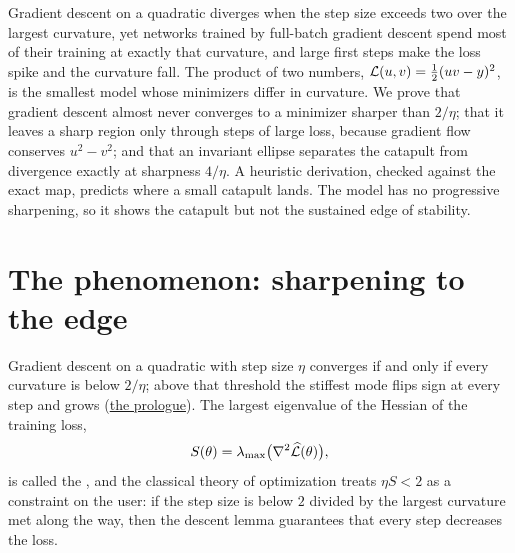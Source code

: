 \newcommand{\stabce}{c_{\mathrm{e}}}

\begin{refsection}

\begin{chaptersummary}
Gradient descent on a quadratic diverges when the step size exceeds two over the largest curvature, yet networks trained by full-batch gradient descent spend most of their training at exactly that curvature, and large first steps make the loss spike and the curvature fall. The product of two numbers, $\mathcal{L}(u,v)=\frac12(uv-y)^2$, is the smallest model whose minimizers differ in curvature. We prove that gradient descent almost never converges to a minimizer sharper than $2/\eta$; that it leaves a sharp region only through steps of large loss, because gradient flow conserves $u^2-v^2$; and that an invariant ellipse separates the catapult from divergence exactly at sharpness $4/\eta$. A heuristic derivation, checked against the exact map, predicts where a small catapult lands. The model has no progressive sharpening, so it shows the catapult but not the sustained edge of stability.
\end{chaptersummary}

\section{The phenomenon: sharpening to the edge}\label{sec:stability:phenomenon}

Gradient descent on a quadratic with step size $\eta$ converges if and only if every curvature is below $2/\eta$; above that threshold the stiffest mode flips sign at every step and grows (\hyperref[ch:prologue]{the prologue}). The largest eigenvalue of the Hessian of the training loss,
\[
  S(\theta)=\lambda_{\max}\bigl(\nabla^2\widehat{\mathcal{L}}(\theta)\bigr),
\]
is called the , and the classical theory of optimization treats $\eta S<2$ as a constraint on the user: if the step size is below $2$ divided by the largest curvature met along the way, then the descent lemma guarantees that every step decreases the loss.


\end{refsection}
